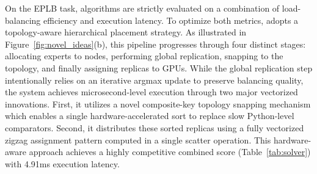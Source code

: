 On the EPLB task, algorithms are strictly evaluated on a combination of load-balancing efficiency and execution latency. To optimize both metrics, \sys{} adopts a topology-aware hierarchical placement strategy. As illustrated in Figure~\ref{fig:novel_ideas}(b), this pipeline progresses through four distinct stages: allocating experts to nodes, performing global replication, snapping to the topology, and finally assigning replicas to GPUs. While the global replication step intentionally relies on an iterative argmax update to preserve balancing quality, the system achieves microsecond-level execution through two major vectorized innovations. First, it utilizes a novel composite-key topology snapping mechanism which enables a single hardware-accelerated sort to replace slow Python-level comparators. Second, it distributes these sorted replicas using a fully vectorized zigzag assignment pattern computed in a single scatter operation. This hardware-aware approach achieves a highly competitive combined score (Table~\ref{tab:solver}) with 4.91ms execution latency.
